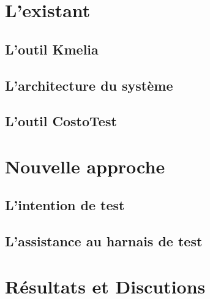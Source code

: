 \documentclass[
10pt, %
a4paper, %
oneside, %
headinclude,footinclude, %
BCOR5mm, %
]{scrartcl}
\begin{document}
\newpage 
\section{L'existant}

\subsection{L'outil Kmelia}

\lipsum[5] %

\subsection{L'architecture du système}

\lipsum[5] %

\subsection{L'outil CostoTest}

\lipsum[5] %


\newpage 
\section{Nouvelle approche}
\lipsum[5] %

\subsection{L'intention de test}
\lipsum[5] %

\subsection{L'assistance au harnais de test}
\lipsum[5] %



\newpage 
\section{Résultats et Discutions}



\lipsum[10] %



\renewcommand{\refname}{\spacedlowsmallcaps{References}} %
\newpage 



\end{document}
